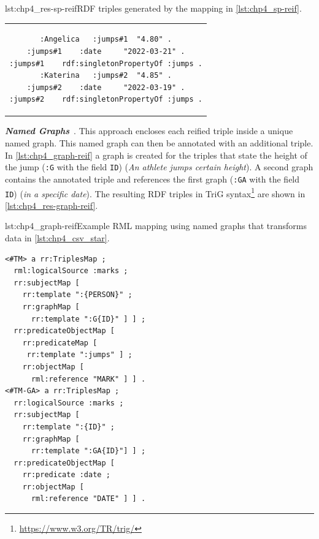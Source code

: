 \noindent\hspace{0.12\linewidth}\begin{minipage}{\linewidth}
\begin{captionedlisting}{lst:chp4_res-sp-reif}{RDF triples generated by the mapping in \cref{lst:chp4_sp-reif}.}
\centering
\begin{tabular}{c}
\hspace{4em}
{\begin{lstlisting}[basicstyle=\ttfamily\small,label={list:example1},columns=flexible]
:Angelica   :jumps#1  "4.80" .
:jumps#1    :date     "2022-03-21" .
:jumps#1    rdf:singletonPropertyOf :jumps .
:Katerina   :jumps#2  "4.85" .
:jumps#2    :date     "2022-03-19" .
:jumps#2    rdf:singletonPropertyOf :jumps .
\end{lstlisting}}
\end{tabular}
\end{captionedlisting}
\end{minipage}



\textit{\textbf{Named Graphs}}~\citep{carroll2005namedgraphs}. This approach encloses each reified triple inside a unique named graph. This named graph can then be annotated with an additional triple. In \cref{lst:chp4_graph-reif} a graph is created for the triples that state the height of the jump (\texttt{:G} with the field \texttt{ID}) (\textit{An athlete jumps certain height}). A second graph contains the annotated triple and references the first graph (\texttt{:GA} with the field \texttt{ID}) (\textit{in a specific date}). The resulting RDF triples in TriG syntax\footnote{\url{https://www.w3.org/TR/trig/}} are shown in \cref{lst:chp4_res-graph-reif}.

\begin{minipage}{\linewidth}
\begin{captionedlisting}{lst:chp4_graph-reif}{Example RML mapping using named graphs that transforms data in \cref{lst:chp4_csv_star}.}
\centering
\begin{multicols}{2}
{\begin{lstlisting}[basicstyle=\ttfamily\small,label={list:example1},columns=flexible]
<#TM> a rr:TriplesMap ;
  rml:logicalSource :marks ;
  rr:subjectMap [ 
    rr:template ":{PERSON}" ;
    rr:graphMap [
      rr:template ":G{ID}" ] ] ;
  rr:predicateObjectMap [ 
    rr:predicateMap [
     rr:template ":jumps" ] ;
    rr:objectMap [
      rml:reference "MARK" ] ] .
<#TM-GA> a rr:TriplesMap ;
  rr:logicalSource :marks ;
  rr:subjectMap [ 
    rr:template ":{ID}" ;
    rr:graphMap [
      rr:template ":GA{ID}"] ] ;
  rr:predicateObjectMap [ 
    rr:predicate :date ;
    rr:objectMap [
      rml:reference "DATE" ] ] .
\end{lstlisting}}
\end{multicols}
\end{captionedlisting}
\end{minipage}

